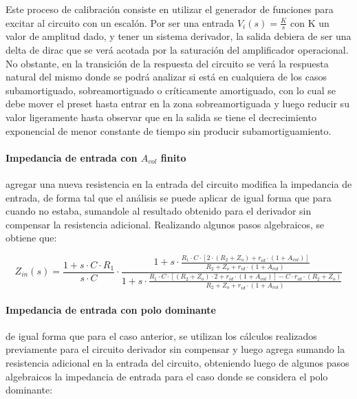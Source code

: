 Este proceso de calibraci\'on consiste en utilizar el generador de funciones para excitar al circuito con un escal\'on. Por ser una entrada $V_i(s) = \frac{K}{s}$ con K un valor de amplitud dado, y tener un sistema derivador, la salida debiera de ser una delta de dirac que se ver\'a acotada por la saturaci\'on del amplificador operacional. No obstante, en la transici\'on de la respuesta del circuito se ver\'a la respuesta natural del mismo donde se podr\'a analizar si est\'a en cualquiera de los casos subamortiguado, sobreamortiguado o cr\'iticamente amortiguado, con lo cual se debe mover el preset hasta entrar en la zona sobreamortiguada y luego reducir su valor ligeramente hasta observar que en la salida se tiene el decrecimiento exponencial de menor constante de tiempo sin producir subamortiguamiento.

\paragraph*{Impedancia de entrada con $A_{vol}$ finito} agregar una nueva resistencia en la entrada del circuito modifica la impedancia de entrada, de forma tal que el an\'alisis se puede aplicar de igual forma que para cuando no estaba, sumandole al resultado obtenido para el derivador sin compensar la resistencia adicional. Realizando algunos pasos algebraicos, se obtiene que:

\begin{equation}
	Z_{in}(s) = \frac{1 + s \cdot C  \cdot R_1}{s \cdot C} \cdot \frac{1 + s \cdot \frac{R_1 \cdot C \cdot \left[ 2 \cdot (R_2 + Z_o) + r_{id} \cdot(1 + A_{vol}) \right]}{R_2 + Z_o + r_{id} \cdot (1 + A_{vol})}}{1 + s \cdot \frac{R_1 \cdot C \cdot \left[ (R_2 + Z_o) \cdot 2 + r_{id} \cdot ( 1 + A_{vol}) \right] - C \cdot r_{id} \cdot ( R_2 + Z_o)}{R_2 + Z_o + r_{id} \cdot(1+A_{vol})}}
\end{equation}


\paragraph*{Impedancia de entrada con polo dominante} de igual forma que para el caso anterior, se utilizan los c\'alculos realizados previamente para el circuito derivador sin compensar y luego agrega sumando la resistencia adicional en la entrada del circuito, obteniendo luego de algunos pasos algebraicos la impedancia de entrada para el caso donde se considera el polo dominante:

